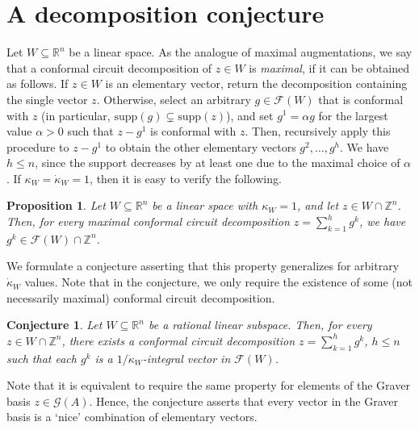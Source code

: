\documentclass[11pt, a4paper]{article}
\newcommand{\Le}{\kappa}
\newcommand{\supp}{\mathrm{supp}}
\newcommand{\1}{\mathbbm{1}}
\newcommand{\kd}{{\dot{\kappa}}}
\newcommand{\EE}{\mathcal F}
\newtheorem{prop}[theorem]{Proposition}
\newtheorem{conj}{Conjecture}[theorem]
\theoremstyle{case}
\newcommand{\R}{\mathbb{R}}
\newcommand{\Z}{\mathbb{Z}}
\begin{document}
%

\section{A decomposition conjecture}\label{sec:conjecture}

Let $W\subseteq \R^n$ be a linear space.
As the analogue of maximal augmentations, we say that a conformal circuit decomposition of $z\in W$ is \emph{maximal}, if it can be obtained as follows. If $z\in W$ is an elementary vector, return the decomposition containing the single vector $z$. Otherwise, select an arbitrary $g\in\EE(W)$ that is conformal with $z$ (in particular, $\supp(g)\subsetneq \supp(z)$), and set $g^1=\alpha g$ for the largest value $\alpha>0$ such that $z- g^1$ is conformal with $z$. Then, recursively apply this procedure to $z- g^1$ to obtain the other elementary vectors $g^2,\ldots,g^h$. We have $h\le n$, since the support decreases by at least one due to the maximal choice of $\alpha$.
If $\Le_W=\kd_W=1$, then it is easy to verify the following.

\begin{prop}\label{prop:kappa-1-decompose}
Let $W\subseteq \R^n$ be a linear space with $\Le_W=1$, and let $z\in W\cap \Z^n$. Then, for every maximal conformal circuit decomposition $z=\sum_{k=1}^h g^k$, we have $g^k\in \EE(W)\cap \Z^n$.
\end{prop}

We formulate a conjecture asserting that this property generalizes for arbitrary $\kd_W$ values. Note that in the conjecture, we only require the existence of some (not necessarily maximal) conformal circuit decomposition.
\begin{conj} \label{conj:decompose}
Let $W\subseteq\R^n$ be a rational linear subspace. Then, for every $z\in W\cap \Z^n$, there exists a conformal circuit decomposition
$z=\sum_{k=1}^h g^k$,  $h\le n$ such that each $g^k$ is  a $1/\dot\kappa_W$-integral  vector in $\EE(W)$.  
\end{conj}
Note that it is equivalent to require the same property for elements of the Graver basis $z\in \mathcal{G}(A)$. Hence, the conjecture asserts that every vector in the Graver basis is a `nice' combination of elementary vectors.

\medskip
\end{document}
